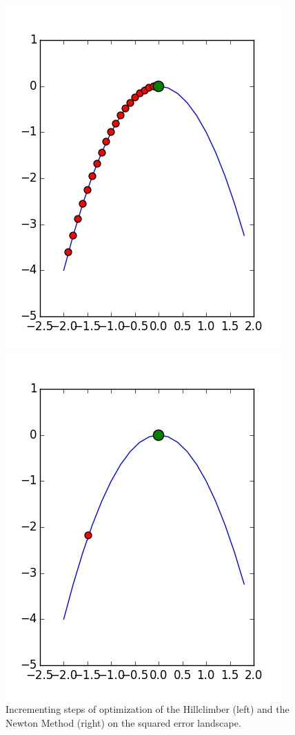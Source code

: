 \documentclass{scrartcl}
\begin{document}
\begin{figure}[H]
\centering
\begin{minipage}{.5\textwidth}
  \centering
  \includegraphics[width=.8\linewidth]{img/ex1/runs/HC-SquaredError2D_-1,9.jpg}
\end{minipage}%
\begin{minipage}{.5\textwidth}
  \centering
  \includegraphics[width=.8\linewidth]{img/ex1/runs/NM-SquaredError2D_-1,48.jpg}
\end{minipage}
\caption{Incrementing steps of optimization of the Hillclimber (left) and the Newton Method (right) on the squared error landscape.}
\label{fig:stepssquared}
\end{figure}
\end{document}
